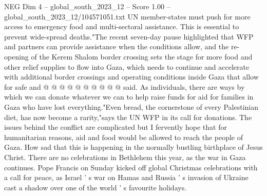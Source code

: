 \begin{textsample}{NEG Dim 4 – global\_south\_2023\_12 – Score 1.00 – global\_south\_2023\_12/104571051.txt}
UN member-states must push for more access to emergency food and multi-sectoral assistance.
This is essential to prevent wide-spread deaths."The recent seven-day pause highlighted that WFP and partners can provide assistance when the conditions allow, and the re-opening of the Kerem Shalom border crossing sets the stage for more food and other relief supplies to flow into Gaza, which needs to continue and accelerate with additional border crossings and operating conditions inside Gaza that allow for safe and @ @ @ @ @ @ @ @ @ @ said.
As individuals, there are ways by which we can donate whatever we can to help raise funds for aid for families in Gaza who have lost everything."Even bread, the cornerstone of every Palestinian diet, has now become a rarity,"says the UN WFP in its call for donations.
The issues behind the conflict are complicated but I fervently hope that for humanitarian reasons, aid and food would be allowed to reach the people of Gaza.
How sad that this is happening in the normally bustling birthplace of Jesus Christ.
There are no celebrations in Bethlehem this year, as the war in Gaza continues.
Pope Francis on Sunday kicked off global Christmas celebrations with a call for peace, as Israel ' s war on Hamas and Russia ' s invasion of Ukraine cast a shadow over one of the world ' s favourite holidays.

\end{textsample}

